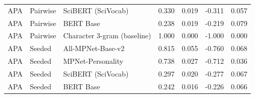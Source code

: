 \begin{table}[ht]
\begin{tabular}{lllrrrr}
APA & Pairwise & SciBERT (SciVocab) & 0.330 & 0.019 & -0.311 & 0.057 \\
APA & Pairwise & BERT Base & 0.238 & 0.019 & -0.219 & 0.079 \\
APA & Pairwise & Character 3-gram (baseline) & 1.000 & 0.000 & -1.000 & 0.000 \\
APA & Seeded & All-MPNet-Base-v2 & 0.815 & 0.055 & -0.760 & 0.068 \\
APA & Seeded & MPNet-Personality & 0.738 & 0.027 & -0.712 & 0.036 \\
APA & Seeded & SciBERT (SciVocab) & 0.297 & 0.020 & -0.277 & 0.067 \\
APA & Seeded & BERT Base & 0.242 & 0.016 & -0.226 & 0.066 \\
\bottomrule
\end{tabular}
\end{table}
